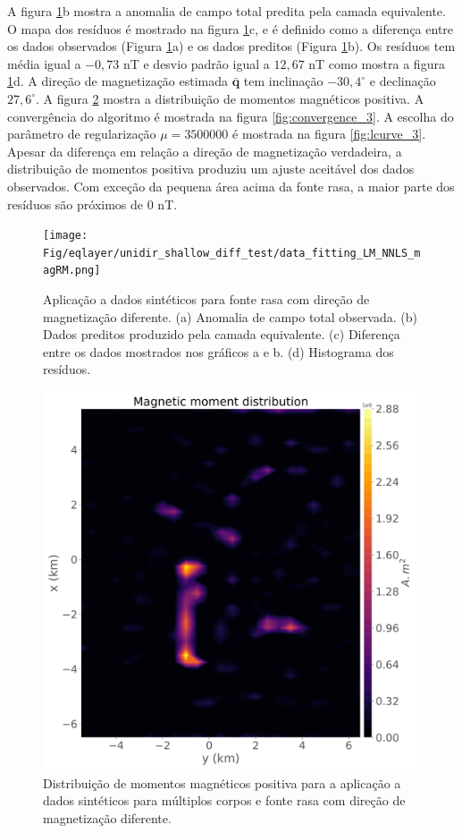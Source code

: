 A figura \ref{fig:data_fitting_3}b mostra a anomalia de campo total predita pela camada equivalente. O mapa dos resíduos é mostrado na figura \ref{fig:data_fitting_3}c, e é definido como a diferença entre os dados observados (Figura \ref{fig:data_fitting_3}a) e os dados preditos (Figura \ref{fig:data_fitting_3}b). Os resíduos tem média igual a $-0,73$ nT e desvio padrão igual a  $12,67$ nT como mostra a figura \ref{fig:data_fitting_3}d. A direção de magnetização estimada $\bar{\mathbf{q}}$ tem inclinação $-30,4^\circ$ e declinação $27,6^\circ$. A figura \ref{fig:dist_momentos_pos_3} mostra a distribuição de momentos magnéticos positiva. A convergência do algoritmo é mostrada na figura \ref{fig:convergence_3}. A escolha do parâmetro de regularização $\mu = 3500000$ é mostrada na figura \ref{fig:lcurve_3}. Apesar da diferença em relação a direção de magnetização verdadeira, a distribuição de momentos positiva produziu um ajuste aceitável dos dados observados. Com exceção da pequena área acima da fonte rasa, a maior parte dos resíduos são próximos de $0$ nT. 

\begin{figure}
	\centering
	\texttt{[image: Fig/eqlayer/unidir\_shallow\_diff\_test/data\_fitting\_LM\_NNLS\_magRM.png]}
	\caption{Aplicação a dados sintéticos para fonte rasa com direção de magnetização diferente. (a) Anomalia de campo total observada. (b) Dados preditos produzido pela camada equivalente. (c) Diferença entre os dados mostrados nos gráficos a e b. (d) Histograma dos resíduos.}
	\label{fig:data_fitting_3}
\end{figure}

\begin{figure}
	\centering
	\includegraphics[width=.9\textwidth]{Fig/eqlayer/unidir_shallow_diff_test/magnetic_moment_positive_LM_NNLS_magRM.png}
	\caption{Distribuição de momentos magnéticos positiva para a aplicação a dados sintéticos para múltiplos corpos e fonte rasa com direção de magnetização diferente.}
	\label{fig:dist_momentos_pos_3}
\end{figure}

